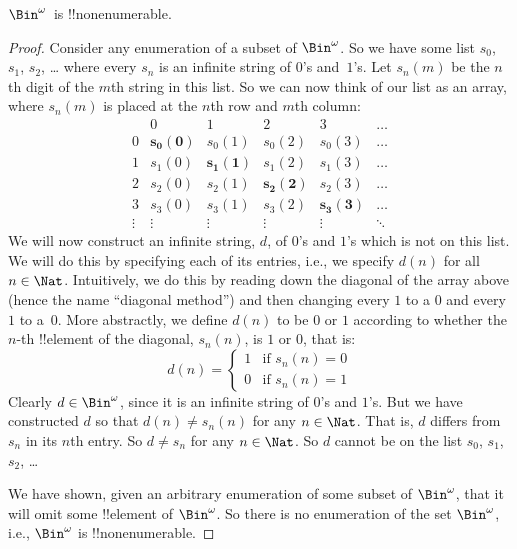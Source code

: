\begin{thm}
$\Bin^\omega$~is !!{nonenumerable}.
\end{thm}

\begin{proof}
Consider any enumeration of a subset of $\Bin^\omega$. So we have some
list $s_{0}$, $s_{1}$, $s_{2}$, \dots{} where every $s_n$ is an
infinite string of $0$'s and~$1$'s. Let $s_n(m)$ be the $n$th digit of
the $m$th string in this list. So we can now think of our list as an
array, where $s_n(m)$ is placed at the $n$th row and $m$th column:
\[
\begin{array}{c|c|c|c|c|c}
& 0 & 1 & 2 & 3 & \dots \\\hline
0 & \mathbf{s_{0}(0)} & s_{0}(1) & s_{0}(2) & s_0(3) & \dots \\\hline
1 & s_{1}(0)& \mathbf{s_{1}(1)} & s_1(2) & s_1(3) & \dots \\\hline
2 & s_{2}(0)& s_{2}(1) & \mathbf{s_2(2)} & s_2(3) & \dots \\\hline
3 & s_{3}(0)& s_{3}(1) & s_3(2) & \mathbf{s_3(3)} & \dots \\\hline
\vdots & \vdots & \vdots & \vdots & \vdots & \mathbf{\ddots}
\end{array}
\]
We will now construct an infinite string, $d$, of $0$'s and $1$'s
which is not on this list.  We will do this by specifying each of its
entries, i.e., we specify $d(n)$ for all $n \in \Nat$.  Intuitively,
we do this by reading down the diagonal of the array above (hence the
name ``diagonal method'') and then changing every $1$ to a $0$ and
every $1$ to a~$0$. More abstractly, we define $d(n)$ to be $0$ or $1$
according to whether the $n$-th !!{element} of the diagonal, $s_n(n)$,
is $1$ or $0$, that is:
\[
d(n) =
\begin{cases}
1 & \text{if $s_{n}(n) = 0$}\\
0 & \text{if $s_{n}(n) = 1$}
\end{cases}
\]
Clearly $d \in \Bin^\omega$, since it is an infinite string of $0$'s
and $1$'s. But we have constructed $d$ so that $d(n) \neq s_n(n)$ for
any $n \in \Nat$. That is, $d$ differs from $s_n$ in its $n$th entry.
So $d \neq s_n$ for any $n\in \Nat$. So $d$ cannot be on the list
$s_0$, $s_1$, $s_2$,
\dots

We have shown, given an arbitrary enumeration of some subset of
$\Bin^\omega$, that it will omit some !!{element} of $\Bin^\omega$. So
there is no enumeration of the set $\Bin^\omega$, i.e., $\Bin^\omega$
is !!{nonenumerable}.
\end{proof}

